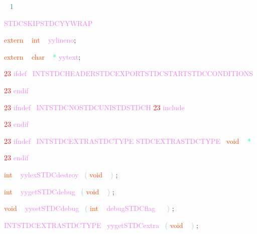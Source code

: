 \documentclass[8, usernames, dvipsnames]{beamer}
\begin{document}
\begin{frame}

 \textcolor{White}{\ }
\textcolor{SeaGreen}{1}

 \textcolor{Violet}{STDCSKIPSTDCYYWRAP}
 
 \textcolor{OrangeRed}{extern}
\textcolor{White}{\ }
\textcolor{OrangeRed}{int}
\textcolor{White}{\ }
\textcolor{Violet}{yylineno}\textcolor{Sepia}{;}

 
 \textcolor{OrangeRed}{extern}
\textcolor{White}{\ }
\textcolor{OrangeRed}{char}
\textcolor{White}{\ }
\textcolor{SpringGreen}{*}
\textcolor{Violet}{yytext}\textcolor{Sepia}{;}

 
  \textcolor{Red}{23}
\textcolor{Violet}{ifdef}\textcolor{White}{\ }
\textcolor{Violet}{INTSTDCHEADERSTDCEXPORTSTDCSTARTSTDCCONDITIONS}
 
 \end{frame}
\begin{frame}
 \textcolor{Red}{23}
\textcolor{Violet}{endif}
 
  \textcolor{Red}{23}
\textcolor{Violet}{ifndef}\textcolor{White}{\ }
\textcolor{Violet}{INTSTDCNOSTDCUNISTDSTDCH}
  \textcolor{Red}{23}
\textcolor{Violet}{include}\textcolor{White}{\ }

  \textcolor{Red}{23}
\textcolor{Violet}{endif}
 
  \textcolor{Red}{23}
\textcolor{Violet}{ifndef}\textcolor{White}{\ }
\textcolor{Violet}{INTSTDCEXTRASTDCTYPE}
 \textcolor{Violet}{STDCEXTRASTDCTYPE}\textcolor{White}{\ }
\textcolor{OrangeRed}{void}
\textcolor{White}{\ }
\textcolor{SpringGreen}{*}

  \textcolor{Red}{23}
\textcolor{Violet}{endif}
 
 \end{frame}
\begin{frame}

 
 \textcolor{OrangeRed}{int}
\textcolor{White}{\ }
\textcolor{Violet}{yylexSTDCdestroy}\textcolor{White}{\ }
\textcolor{SkyBlue}{(}
\textcolor{OrangeRed}{void}
\textcolor{White}{\ }
\textcolor{SkyBlue}{)}
\textcolor{Sepia}{;}

 
 \textcolor{OrangeRed}{int}
\textcolor{White}{\ }
\textcolor{Violet}{yygetSTDCdebug}\textcolor{White}{\ }
\textcolor{SkyBlue}{(}
\textcolor{OrangeRed}{void}
\textcolor{White}{\ }
\textcolor{SkyBlue}{)}
\textcolor{Sepia}{;}

 
 \textcolor{OrangeRed}{void}
\textcolor{White}{\ }
\textcolor{Violet}{yysetSTDCdebug}\textcolor{White}{\ }
\textcolor{SkyBlue}{(}
\textcolor{OrangeRed}{int}
\textcolor{White}{\ }
\textcolor{Violet}{debugSTDCflag}\textcolor{White}{\ }
\textcolor{White}{\ }
\textcolor{SkyBlue}{)}
\textcolor{Sepia}{;}

 
 \textcolor{Violet}{INTSTDCEXTRASTDCTYPE}\textcolor{White}{\ }
\textcolor{Violet}{yygetSTDCextra}\textcolor{White}{\ }
\textcolor{SkyBlue}{(}
\textcolor{OrangeRed}{void}
\textcolor{White}{\ }
\textcolor{SkyBlue}{)}
\textcolor{Sepia}{;}

 
 \end{frame}
\end{document}
